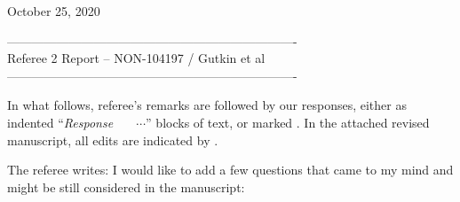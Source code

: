 \documentclass[12pt]{iopart}
\begin{document}
                    \hfill October 25, 2020

\bigskip
\noindent
---------------------------------------------------------------------- \\
Referee 2 Report -- NON-104197 / Gutkin et al \\
---------------------------------------------------------------------- \\

\bigskip
\bigskip



\noindent
In what follows, referee's remarks are followed by our responses, either
as indented ``{\em Response~~~} $\cdots$'' blocks of text, or marked
. In the attached revised manuscript, all edits
are indicated by .
\bigskip\bigskip

The referee writes:
I would like to add a few questions that came to my mind and might
be still considered in the manuscript:
\end{document}
